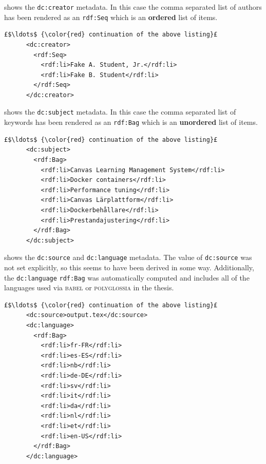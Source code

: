  shows the \texttt{dc:creator} metadata. In this case the comma separated list of authors has been rendered as an \texttt{rdf:Seq} which is an \textbf{ordered} list of items.
\begin{lstlisting}[style=myXML,
caption={The \texttt{dc:creator} metadata embedded in a PDF file}, label={lst:pdfinfoOutputPart9}]
£$\ldots$ {\color{red} continuation of the above listing}£ 
      <dc:creator>
        <rdf:Seq>
          <rdf:li>Fake A. Student, Jr.</rdf:li>
          <rdf:li>Fake B. Student</rdf:li>
        </rdf:Seq>
      </dc:creator>
\end{lstlisting}
\clearpage

 shows the \texttt{dc:subject} metadata. In this case the comma separated list of keywords has been rendered as an \texttt{rdf:Bag} which is an \textbf{unordered} list of items.
\begin{lstlisting}[style=myXML,
caption={The \texttt{dc:subject} metadata embedded in a PDF file}, label={lst:pdfinfoOutputPart10}]
£$\ldots$ {\color{red} continuation of the above listing}£ 
      <dc:subject>
        <rdf:Bag>
          <rdf:li>Canvas Learning Management System</rdf:li>
          <rdf:li>Docker containers</rdf:li>
          <rdf:li>Performance tuning</rdf:li>
          <rdf:li>Canvas Lärplattform</rdf:li>
          <rdf:li>Dockerbehållare</rdf:li>
          <rdf:li>Prestandajustering</rdf:li>
        </rdf:Bag>
      </dc:subject>
\end{lstlisting}

 shows the \texttt{dc:source} and \texttt{dc:language} metadata. The value of \texttt{dc:source} was not set explicitly, so this seems to have been derived in some way. Additionally, the \texttt{dc:language} \texttt{rdf:Bag} was automatically computed and includes all of the languages used via \textsc{babel} or \textsc{polyglossia} in the thesis.
\begin{lstlisting}[style=myXML,
caption={The \texttt{dc:source} and \texttt{dc:language} metadata embedded in a PDF file}, label={lst:pdfinfoOutputPart11}]
£$\ldots$ {\color{red} continuation of the above listing}£ 
      <dc:source>output.tex</dc:source>
      <dc:language>
        <rdf:Bag>
          <rdf:li>fr-FR</rdf:li>
          <rdf:li>es-ES</rdf:li>
          <rdf:li>nb</rdf:li>
          <rdf:li>de-DE</rdf:li>
          <rdf:li>sv</rdf:li>
          <rdf:li>it</rdf:li>
          <rdf:li>da</rdf:li>
          <rdf:li>nl</rdf:li>
          <rdf:li>et</rdf:li>
          <rdf:li>en-US</rdf:li>
        </rdf:Bag>
      </dc:language>
\end{lstlisting}

